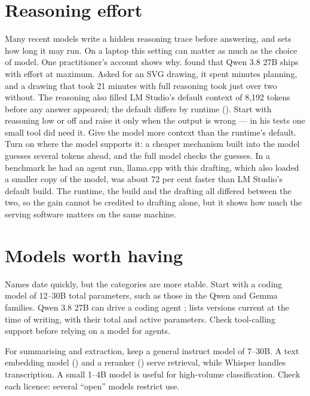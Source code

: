 \section{Reasoning effort}

Many recent models write a hidden reasoning trace before answering, and
 sets how long it may run. On a laptop this setting can
matter as much as the choice of model. One practitioner's account shows why.
\textcite{willison2026qwen38} found that Qwen 3.8 27B ships with effort at
maximum. Asked for an SVG drawing, it spent minutes planning, and a drawing
that took 21 minutes with full reasoning took just over two without. The
reasoning also filled LM Studio's default context of 8,192 tokens before any
answer appeared; the default differs by runtime (). Start with
reasoning low or off and raise it only when the output is wrong --- in his
tests one small tool did need it. Give the model more context than the
runtime's default. Turn on  where the model
supports it: a cheaper mechanism built into the model guesses several tokens
ahead, and the full model checks the guesses. In a benchmark he had an agent
run, llama.cpp with this drafting, which also loaded a smaller copy of the
model, was about 72 per cent faster than LM Studio's default build. The
runtime, the build and the drafting all differed between the two, so the gain
cannot be credited to drafting alone, but it shows how much the serving
software matters on the same machine.

\section{Models worth having}

Names date quickly, but the categories are more stable. Start with a coding
model of 12--30B total parameters, such as those in the Qwen and Gemma
families. Qwen 3.8 27B can drive a coding agent \parencite{willison2026qwen38};
 lists versions current at the time of writing, with
their total and active parameters. Check tool-calling support before relying
on a model for agents.

For summarising and extraction, keep a general instruct model of 7--30B.
A text embedding model () and a reranker ()
serve retrieval, while Whisper handles transcription. A small 1--4B model is
useful for high-volume classification. Check each licence: several ``open''
models restrict use.

